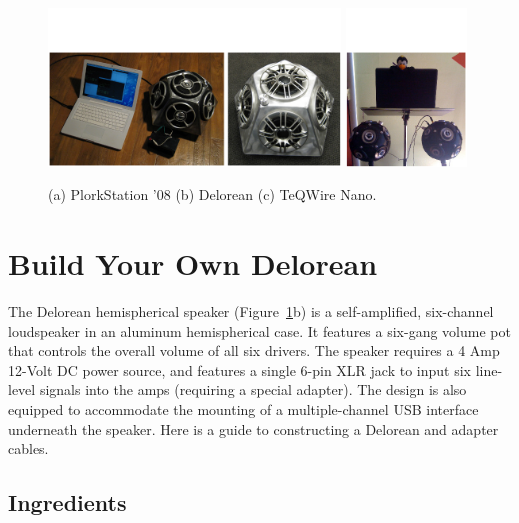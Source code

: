\begin{figure}[t]
\centering
\includegraphics[height=42mm]{img-4-eps-converted-to-crop.pdf} 
\includegraphics[height=42mm]{img-5-eps-converted-to-crop.pdf}
\caption{(a) PlorkStation '08 (b) Delorean (c) TeQWire Nano.}
\label{Smallwood:img-4-5}
\end{figure}



\section{Build Your Own Delorean}

The Delorean hemispherical speaker (Figure~\ref{Smallwood:img-4-5}b) is a self-amplified, six-channel
loudspeaker in an aluminum hemispherical case. It features a six-gang volume pot
that controls the overall volume of all six drivers.  The speaker requires a 4
Amp 12-Volt DC power source, and features a single 6-pin XLR jack to input six
line-level signals into the amps (requiring a special adapter).  The design is
also equipped to accommodate the mounting of a multiple-channel USB interface
underneath the speaker.  Here is a guide to constructing a Delorean and adapter
cables.

\subsection{Ingredients}

